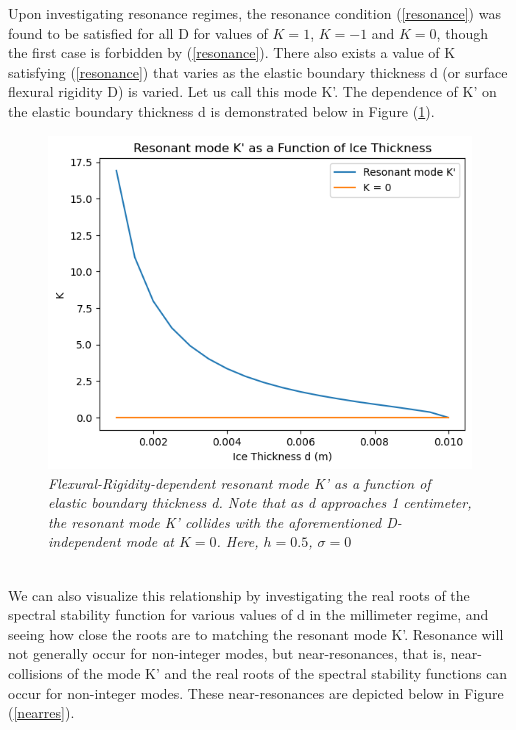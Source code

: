 \documentclass{article}
\begin{document}
Upon investigating resonance regimes, the resonance condition (\ref{resonance}) was found to be satisfied for all D for values of \(K = 1\), \(K = -1\) and \(K = 0\), though the first case is forbidden by (\ref{resonance}). There also exists a value of K satisfying (\ref{resonance}) that varies as the elastic boundary thickness d (or surface flexural rigidity D) is varied. Let us call this mode K'. The dependence of K' on the elastic boundary thickness d is demonstrated below in Figure (\ref{Kmode}).  \\

\begin{figure}[hbt!]
\centering
\includegraphics[scale = .5]{Resonant.png}
\caption{\emph{Flexural-Rigidity-dependent resonant mode K' as a function of elastic boundary thickness d. Note that as d approaches 1 centimeter, the resonant mode K' collides with the aforementioned D-independent mode at \(K = 0\). Here, \(h = 0.5\), \(\sigma = 0\)}} \label{Kmode}
\end{figure}
\\

We can also visualize this relationship by investigating the real roots of the spectral stability function for various values of d in the millimeter regime, and seeing how close the roots are to matching the resonant mode K'. Resonance will not generally occur for non-integer modes, but near-resonances, that is, near-collisions of the mode K' and the real roots of the spectral stability functions can occur for non-integer modes. These near-resonances are depicted below in Figure (\ref{nearres}).
\\
\end{document}
